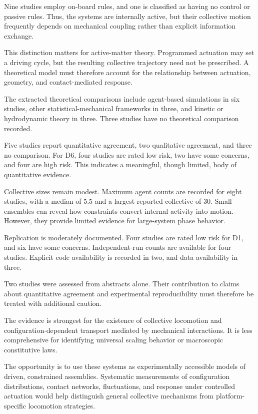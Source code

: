 Nine studies employ on-board rules,
and one is classified as having
no control or passive rules.
Thus, the systems are internally
active, but their collective
motion frequently depends on
mechanical coupling rather than
explicit information exchange.

This distinction matters for
active-matter theory. Programmed
actuation may set a driving
cycle, but the resulting
collective trajectory need
not be prescribed. A theoretical
model must therefore account
for the relationship between
actuation, geometry, and
contact-mediated response.

The extracted theoretical comparisons
include agent-based simulations in
six studies, other statistical-mechanical
frameworks in three, and kinetic
or hydrodynamic theory in three.
Three studies have no theoretical
comparison recorded.

Five studies report quantitative
agreement, two qualitative agreement,
and three no comparison.
For D6, four studies are rated
low risk, two have some concerns,
and four are high risk.
This indicates a meaningful,
though limited, body of
quantitative evidence.

Collective sizes remain modest.
Maximum agent counts are recorded
for eight studies, with a
median of 5.5 and a largest
reported collective of 30.
Small ensembles can reveal
how constraints convert
internal activity into
motion. However, they
provide limited evidence
for large-system phase
behavior.

Replication is moderately documented.
Four studies are rated low risk
for D1, and six have some concerns.
Independent-run counts are available
for four studies. Explicit code
availability is recorded in two,
and data availability in three.

Two studies were assessed from
abstracts alone. Their contribution
to claims about quantitative
agreement and experimental
reproducibility must therefore
be treated with additional caution.

The evidence is strongest for
the existence of collective
locomotion and configuration-dependent
transport mediated by mechanical
interactions. It is less
comprehensive for identifying
universal scaling behavior
or macroscopic constitutive laws.

The opportunity is to use
these systems as experimentally
accessible models of driven,
constrained assemblies.
Systematic measurements of
configuration distributions,
contact networks, fluctuations,
and response under controlled
actuation would help distinguish
general collective mechanisms
from platform-specific
locomotion strategies.

